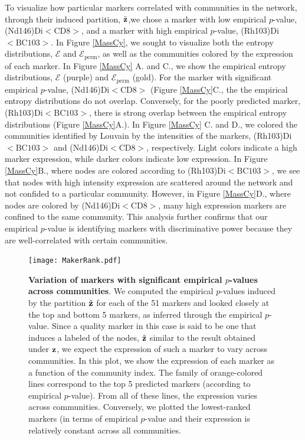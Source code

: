 To visualize how particular markers correlated with communities in the network, through their induced partition, $\tilde{\bf z}$,we chose a marker with low empirical $p$-value, (Nd146)Di$<\text{CD}8>$, and a marker with high empirical $p$-value, (Rh103)Di$<\text{BC103}>$. In Figure \ref{MassCy}, we sought to visualize both the entropy distributions, $\mathcal{E}$ and $\mathcal{E}_{\text{perm}}$, as well as the communities colored by the expression of each marker. In Figure \ref{MassCy} A. and C., we show the empirical entropy distributions, $\mathcal{E}$ (purple) and $\mathcal{E}_{\text{perm}}$ (gold). For the marker with significant empirical $p$-value, (Nd146)Di$<\text{CD}8>$ (Figure \ref{MassCy}C., the the empirical entropy distributions do not overlap. Conversely, for the poorly predicted marker, (Rh103)Di$<\text{BC103}>$, there is strong overlap between the empirical entropy distributions (Figure \ref{MassCy}A.). In Figure \ref{MassCy} C. and D., we colored the communities identified by Louvain by the intensities of the markers, (Rh103)Di$<\text{BC103}>$ and (Nd146)Di$<\text{CD}8>$, respectively. Light colors indicate a high marker expression, while darker colors indicate low expression. In Figure \ref{MassCy}B., where nodes are colored according to (Rh103)Di$<\text{BC103}>$, we see that nodes with high intensity expression are scattered around the network and not confided to a particular community. However, in Figure \ref{MassCy}D., where nodes are colored by (Nd146)Di$<\text{CD}8>$, many high expression markers are confined to the same community. This analysis further confirms that our empirical $p$-value is identifying markers with discriminative power because they are well-correlated with certain communities.

\begin{figure}[h!]
\begin{center}
\texttt{[image: MakerRank.pdf]}
\caption{{\bf Variation of markers with significant empirical $p$-values across communities}. We computed the empirical $p$-values induced by the partition $\tilde{\bf z}$ for each of the 51 markers and looked closely at the top and bottom 5 markers, as inferred through the empirical $p$-value. Since a quality marker in this case is said to be one that induces a labeled of the nodes, $\tilde{\bf z}$ similar to the result obtained under ${\bf z}$, we expect the expression of such a marker to vary across communities. In this plot, we show the expression of each marker as a function of the community index. The family of orange-colored lines correspond to the top 5 predicted markers (according to empirical $p$-value). From all of these lines, the expression varies across communities. Conversely, we plotted the lowest-ranked markers (in terms of empirical $p$-value and their expression is relatively constant across all communities.}
\label{MarkerRank}
\end{center}
\end{figure}

